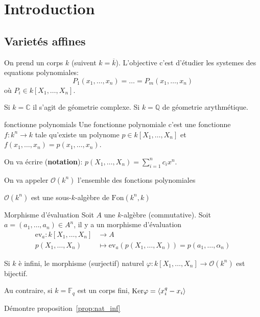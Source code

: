 \chapter{Introduction}

\section{Varietés affines}

On prend un corps \(k\) (suivent \(k = \overline{k}\)). L'objective c'est
d'étudier les systemes des equations polynomiales:
\[
  P_{1}{(x_{1}, \dots, x_{n})} = \dots = P_{m}{(x_{1}, \dots, x_{n})}
\]
où \(P_{i} \in k[X_{1}, \dots, X_{n}]\).

Si \(k = \mathbb{C}\) il s'agit de géometrie complexe. Si \(k = \mathbb{Q}\) de
géometrie arythmétique.

\begin{definition}{fonctionne polynomials}
    Une fonctionne polynomiale c'est une fonctionne \(f : k^{n} \to k\) tale
    qu'existe un polynome \(p \in k[X_{1}, \dots, X_{n}]\) et \(f{(x_{1}, \dots,
    x_{n})} = p{(x_{1}, \dots, x_{n})}\).

    On va écrire (\textbf{notation}): \(p {(X_{1}, \dots, X_{n})} =
    \sum_{i=1}^{n} c_{i} x^{n} \).

    On va appeler \(\mathcal{O}{(k^{n})}\) l'ensemble des fonctions polynomiales
\end{definition}
\begin{remark}{}
    \(\mathcal{O}{(k^{n})}\) est une sous-\(k\)-algèbre de \(\mathrm{Fon}{(k^{n}, k)}\) 
\end{remark}

\begin{definition}{Morphisme d'évaluation}
    Soit \(A\) une \(k\)-algèbre (commutative). Soit \(a = {(a_{1}, \dots,
    a_{n})} \in A^{n}\), il y a un morphisme d'évaluation
    \begin{align*}
        \mathrm{ev}_a: k[X_{1}, \dots, X_{n}] &\longrightarrow A \\
        p {(X_{1}, \dots, X_{n})} &\longmapsto   \mathrm{ev}_a(p {(X_{1}, \dots,
        X_{n})}) = p {(a_{1}, \dots, \alpha_{n})}
    \end{align*}
\end{definition}

\begin{proposition}{}\label{prop:nat_inf}
    Si \(k\) è infini, le morphisme (surjectif) naturel \(\varphi : k[X_{1},
    \dots, X_{n}] \to \mathcal{O}{(k^{n})}\) est bijectif. 

    Au contraire, si \(k = \mathbb{F}_q\) est un corps fini,
    \(\mathrm{Ker}\varphi = {\left\langle x_{i}^{q} - x_{i}\right\rangle} \) 
\end{proposition}
\begin{eser}{}
    Démontre proposition~\ref{prop:nat_inf}
\end{eser}


